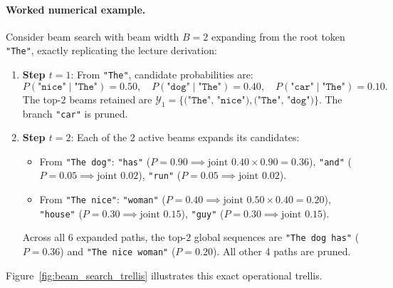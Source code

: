 \documentclass[../../main.tex]{subfiles}
\begin{document}
\paragraph{Worked numerical example.}
Consider beam search with beam width $B=2$ expanding from the root token \texttt{"The"}, exactly replicating the lecture derivation:
\begin{enumerate}
    \item \textbf{Step $t=1$}: From \texttt{"The"}, candidate probabilities are:
    \begin{equation}
    P(\texttt{"nice"} \mid \texttt{"The"}) = 0.50, \quad P(\texttt{"dog"} \mid \texttt{"The"}) = 0.40, \quad P(\texttt{"car"} \mid \texttt{"The"}) = 0.10.
    \end{equation}
    The top-$2$ beams retained are $\mathcal{Y}_1 = \{\texttt{("The", "nice")}, \texttt{("The", "dog")}\}$. The branch \texttt{"car"} is pruned.
    \item \textbf{Step $t=2$}: Each of the 2 active beams expands its candidates:
    \begin{itemize}
        \item From \texttt{"The dog"}: \texttt{"has"} ($P=0.90 \implies \text{joint } 0.40 \times 0.90 = 0.36$), \texttt{"and"} ($P=0.05 \implies \text{joint } 0.02$), \texttt{"run"} ($P=0.05 \implies \text{joint } 0.02$).
        \item From \texttt{"The nice"}: \texttt{"woman"} ($P=0.40 \implies \text{joint } 0.50 \times 0.40 = 0.20$), \texttt{"house"} ($P=0.30 \implies \text{joint } 0.15$), \texttt{"guy"} ($P=0.30 \implies \text{joint } 0.15$).
    \end{itemize}
    Across all 6 expanded paths, the top-$2$ global sequences are \texttt{"The dog has"} ($P=0.36$) and \texttt{"The nice woman"} ($P=0.20$). All other 4 paths are pruned.
\end{enumerate}
Figure~\ref{fig:beam_search_trellis} illustrates this exact operational trellis.
\end{document}
